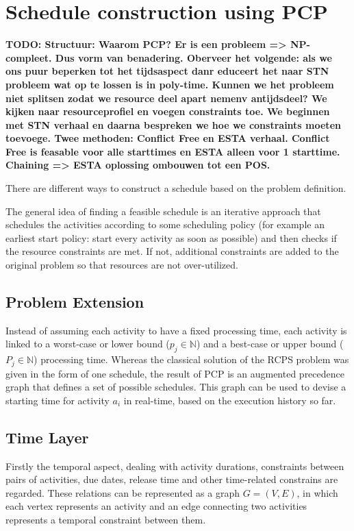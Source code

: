 \documentclass{article}
\newcommand{\TODO}[1]{{\color{red}\textbf{TODO: #1}}}
\begin{document}
\newpage

\section{Schedule construction using PCP}
\TODO{Structuur: Waarom PCP? Er is een probleem => NP-compleet. Dus vorm van benadering. Oberveer het volgende: als we ons puur beperken tot het tijdsaspect danr educeert het naar STN probleem wat op te lossen is in poly-time. Kunnen we het probleem niet splitsen zodat we resource deel apart nemenv antijdsdeel? We kijken naar resourceprofiel en voegen constraints toe. We beginnen met STN verhaal en daarna bespreken we hoe we constraints moeten toevoege. Twee methoden: Conflict Free en ESTA verhaal. Conflict Free is feasable voor alle starttimes en ESTA alleen voor 1 starttime. Chaining => ESTA oplossing ombouwen tot een POS. }  

There are different ways to construct a schedule based on the problem definition. 

The general idea of finding a feasible schedule is an iterative approach that schedules the activities according to some scheduling policy (for example an earliest start policy: start every activity as soon as possible) and then checks if the resource constraints are met. If not, additional constraints are added to the original problem so that resources are not over-utilized.

\subsection{Problem Extension}
Instead of assuming each activity to have a fixed processing time, each activity is linked to a worst-case or lower bound ($p_{j} \in \mathbb{N}$) and a best-case or upper bound ($P_{j} \in \mathbb{N}$) processing time.
Whereas the classical solution of the RCPS problem was given in the form of one schedule, the result of PCP is an augmented precedence graph that defines a set of possible schedules.
This graph can be used to devise a starting time for activity $a_i$ in real-time, based on the execution history so far. 

\subsection{Time Layer}
Firstly the temporal aspect, dealing with activity durations, constraints between pairs of activities, due dates, release time and other time-related constrains are regarded.
These relations can be represented as a graph $G=(V,E)$, in which each vertex represents an activity and an edge connecting two activities represents a temporal constraint between them.
\end{document}

